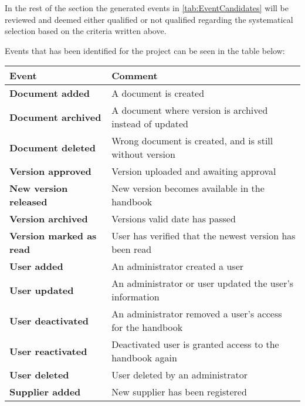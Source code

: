 In the rest of the section the generated events in \cref{tab:EventCandidates} will be reviewed and deemed either qualified or not qualified regarding the systematical selection based on the criteria written above.

Events that has been identified for the project can be seen in the table below:

\begin{table}[H]
	\centering
	\begin{tabular}{m{4.2 cm} l}
		\hline
		Event & Comment\\
		\hline
		\textbf{Document added} & A document is created\\
		\textbf{Document archived} & A document where version is archived instead of updated\\
		\textbf{Document deleted} & Wrong document is created, and is still without version\\
		\textbf{Version approved}  & Version uploaded and awaiting approval\\
		\textbf{New version released} &  New version becomes available in the handbook\\
		\textbf{Version archived} & Versions valid date has passed\\
		\textbf{Version marked \newline as read} & User has verified that the newest version has been read\\
		\textbf{User added} & An administrator created a user\\
		\textbf{User updated} & An administrator or user updated the user's information\\
		\textbf{User deactivated} & An administrator removed a user's access for the handbook\\
		\textbf{User reactivated} & Deactivated user is granted access to the handbook again\\
		\textbf{User deleted} & User deleted by an administrator\\
		\textbf{Supplier added} & New supplier has been registered\\

\end{tabular}
\end{table}
